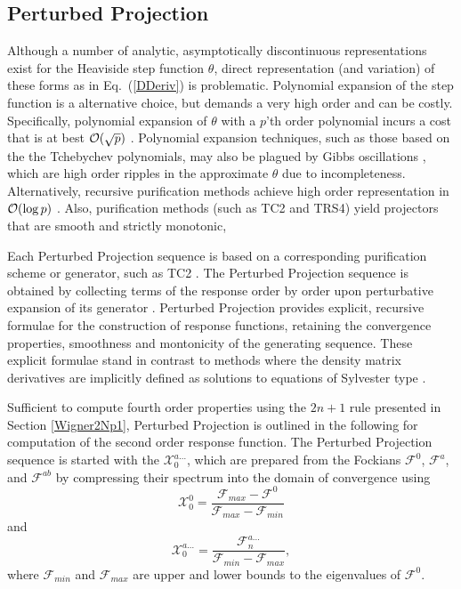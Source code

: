 \documentclass[prl,aps,preprint,showpacs,superbib]{revtex4}
\def\F{\mathcal{F}}
\def\X{\mathcal{X}}
\begin{document}
\subsection{Perturbed Projection}\label{ResponseFunctions}

Although a number of analytic, asymptotically discontinuous representations exist for the Heaviside 
step function $\theta$, direct representation (and variation) of these forms as in Eq.~(\ref{DDeriv}) 
is problematic. Polynomial expansion of the step function is a alternative choice, but demands a very high 
order and can be costly.  Specifically, polynomial expansion of $\theta$ with a $p$'th order polynomial 
incurs a cost that is at best ${\cal O}(\sqrt{p})$ \cite{WLiang04}.  Polynomial expansion techniques,
such as those based on the the Tchebychev polynomials, may also be plagued by Gibbs oscillations \cite{AVoter96},
which are high order ripples in the approximate $\theta$ due to incompleteness.
Alternatively, recursive purification methods achieve high order representation in 
${\cal O}( \log p )$ \cite{ANiklasson03}.  Also, purification methods (such as TC2 and TRS4) 
yield projectors that are smooth and strictly monotonic,  

Each Perturbed Projection sequence is based on a corresponding  purification scheme or generator, such as TC2 \cite{ANiklasson02A}.   
The Perturbed Projection sequence is obtained by collecting terms of the response order by 
order upon perturbative expansion of its generator \cite{ANiklasson04}.
Perturbed Projection provides explicit, recursive formulae 
for the construction of response functions, retaining the convergence properties,  smoothness and 
montonicity of the generating sequence.   These explicit formulae stand in contrast to methods where the 
density matrix derivatives are implicitly defined as solutions to equations of Sylvester type \cite{Ochsenfeld97,HLarsen01a,COchsenfeld04}.

Sufficient to compute fourth order properties using the $2 n+1$ rule presented in Section \ref{Wigner2Np1}, 
Perturbed Projection is outlined in the following for computation of the second order response function.  
The Perturbed Projection sequence is started with the  $\X^{a\ldots}_{0}$, which are 
prepared from the Fockians $\F^0$, $\F^a$, and $\F^{ab}$ by  compressing their spectrum into the domain of 
convergence \cite{ANiklasson02A} using
\begin{equation}
    \X^0_{0}=\frac{\F_{max}-\F^0}{\F_{max}-\F_{min}} 
\end{equation}
and 
\begin{equation}
    \X^{a\ldots}_{0}=\frac{\F^{a\ldots}_{n}}{\F_{min}-\F_{max}},
\end{equation}
where $\F_{min}$ and $\F_{max}$ are upper and lower bounds to the eigenvalues of $\F^0$.  
\end{document}
